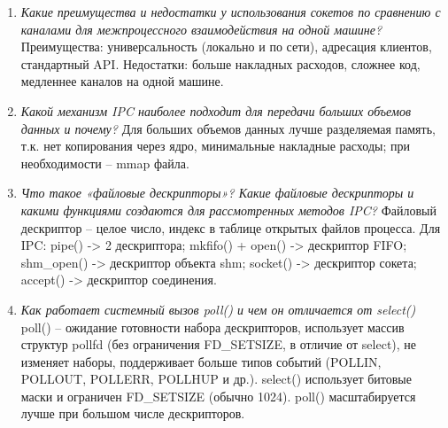 \begin{enumerate}
	Сервер -- socket(), bind(), listen(), accept(), read()/write(), close(), unlink(). 
	Клиент -- socket(), connect(), read()/write(), close().
	\item \textit{Какие преимущества и недостатки у использования сокетов по сравнению с каналами для межпроцессного взаимодействия на одной машине?}\newline 
	Преимущества: универсальность (локально и по сети), адресация клиентов, стандартный API. 
	Недостатки: больше накладных расходов, сложнее код, медленнее каналов на одной машине.
	\item \textit{Какой механизм IPC наиболее подходит для передачи больших объемов данных и почему?}\newline 
	Для больших объемов данных лучше разделяемая память, т.к. нет копирования через ядро, минимальные накладные расходы; при необходимости -- mmap файла.
	\item \textit{Что такое «файловые дескрипторы»? Какие файловые дескрипторы и какими функциями создаются для рассмотренных методов IPC?}\newline 
	Файловый дескриптор -- целое число, индекс в таблице открытых файлов процесса. 
	Для IPC: pipe() -> 2 дескриптора; mkfifo() + open() -> дескриптор FIFO; shm\_open() -> дескриптор объекта shm; socket() -> дескриптор сокета; accept() -> дескриптор соединения.
	\item \textit{Как работает системный вызов poll() и чем он отличается от select()}\newline 
	poll() -- ожидание готовности набора дескрипторов, использует массив структур pollfd (без ограничения FD\_SETSIZE, в отличие от select), не изменяет наборы, поддерживает больше типов событий (POLLIN, POLLOUT, POLLERR, POLLHUP и др.). 
	select() использует битовые маски и ограничен FD\_SETSIZE (обычно 1024).
	poll() масштабируется лучше при большом числе дескрипторов.
\end{enumerate}
